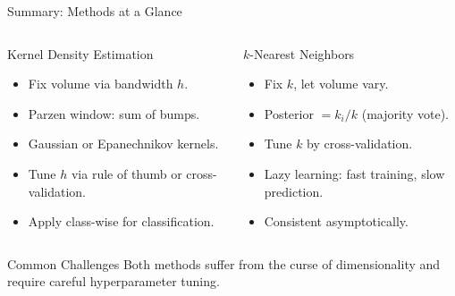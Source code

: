 \begin{frame}{Summary: Methods at a Glance}
  \begin{columns}[t]
      \begin{block}{Kernel Density Estimation}
        \begin{itemize}
          \item Fix volume via bandwidth $h$.
          \item Parzen window: sum of bumps.
          \item Gaussian or Epanechnikov kernels.
          \item Tune $h$ via rule of thumb or cross-validation.
          \item Apply class-wise for classification.
        \end{itemize}
      \end{block}
      \begin{block}{$k$-Nearest Neighbors}
        \begin{itemize}
          \item Fix $k$, let volume vary.
          \item Posterior $= k_i/k$ (majority vote).
          \item Tune $k$ by cross-validation.
          \item Lazy learning: fast training, slow prediction.
          \item Consistent asymptotically.
        \end{itemize}
      \end{block}
  \end{columns}
  \vspace{0.5em}
  \begin{alertblock}{Common Challenges}
    Both methods suffer from the curse of dimensionality and require careful hyperparameter tuning.
  \end{alertblock}
\end{frame}

